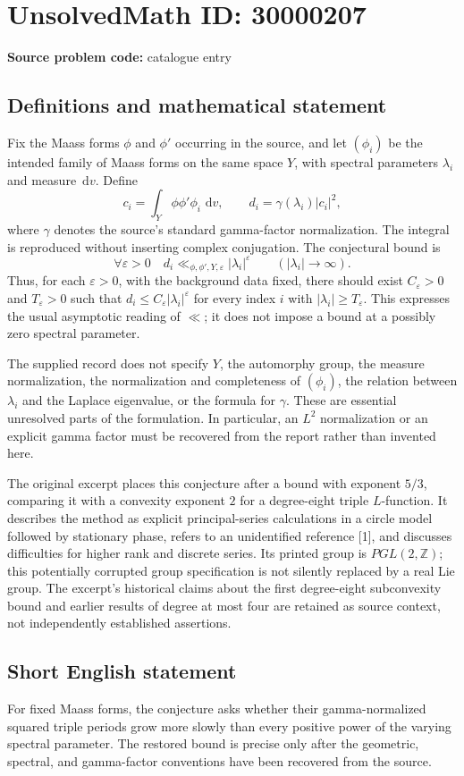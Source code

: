 \documentclass[11pt]{article}
\newcommand{\Z}{\mathbb{Z}}
\newcommand{\dd}{\,\mathrm{d}}
\begin{document}
\section*{UnsolvedMath ID: 30000207}
\textbf{Source problem code:} catalogue entry
\subsection{Definitions and mathematical statement}
Fix the Maass forms $\phi$ and $\phi'$ occurring in the source, and let $(\phi_i)$ be the intended family of Maass forms on the same space $Y$, with spectral parameters $\lambda_i$ and measure $\dd v$. Define
\[
 c_i=\int_Y\phi\phi'\phi_i\,\dd v,
 \qquad d_i=\gamma(\lambda_i)|c_i|^2,
\]
where $\gamma$ denotes the source's standard gamma-factor normalization. The integral is reproduced without inserting complex conjugation. The conjectural bound is
\[
 \forall\varepsilon>0\quad d_i\ll_{\phi,\phi',Y,\varepsilon}|\lambda_i|^\varepsilon
 \qquad (|\lambda_i|\longrightarrow\infty).
\]
Thus, for each $\varepsilon>0$, with the background data fixed, there should exist $C_\varepsilon>0$ and $T_\varepsilon>0$ such that $d_i\le C_\varepsilon|\lambda_i|^\varepsilon$ for every index $i$ with $|\lambda_i|\ge T_\varepsilon$. This expresses the usual asymptotic reading of $\ll$; it does not impose a bound at a possibly zero spectral parameter.

The supplied record does not specify $Y$, the automorphy group, the measure normalization, the normalization and completeness of $(\phi_i)$, the relation between $\lambda_i$ and the Laplace eigenvalue, or the formula for $\gamma$. These are essential unresolved parts of the formulation. In particular, an $L^2$ normalization or an explicit gamma factor must be recovered from the report rather than invented here.

The original excerpt places this conjecture after a bound with exponent $5/3$, comparing it with a convexity exponent $2$ for a degree-eight triple $L$-function. It describes the method as explicit principal-series calculations in a circle model followed by stationary phase, refers to an unidentified reference [1], and discusses difficulties for higher rank and discrete series. Its printed group is $PGL(2,\Z)$; this potentially corrupted group specification is not silently replaced by a real Lie group. The excerpt's historical claims about the first degree-eight subconvexity bound and earlier results of degree at most four are retained as source context, not independently established assertions.
\subsection{Short English statement}
For fixed Maass forms, the conjecture asks whether their gamma-normalized squared triple periods grow more slowly than every positive power of the varying spectral parameter. The restored bound is precise only after the geometric, spectral, and gamma-factor conventions have been recovered from the source.
\end{document}
